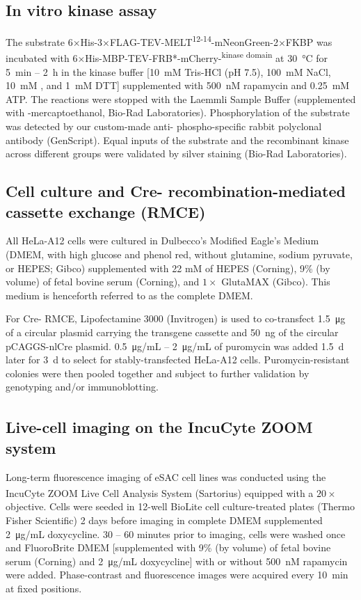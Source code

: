 \subsection{In vitro kinase assay}
The substrate 6×His-3×FLAG-TEV-MELT\textsuperscript{12-14}-mNeonGreen-2×FKBP was incubated with 6×His-MBP-TEV-FRB*-mCherry-\textsuperscript{kinase domain} at \SI{30}{\celsius} for \SI{5}{min} -- \SI{2}{h} in the kinase buffer [\SI{10}{mM} Tris-HCl (pH 7.5), \SI{100}{mM} NaCl, \SI{10}{mM} , and \SI{1}{mM} DTT] supplemented with \SI{500}{nM} rapamycin and \SI{0.25}{mM} ATP. The reactions were stopped with the Laemmli Sample Buffer (supplemented with \textbeta-mercaptoethanol, Bio-Rad Laboratories). Phosphorylation of the substrate was detected by our custom-made anti- phospho-specific rabbit polyclonal antibody (GenScript). Equal inputs of the substrate and the recombinant kinase across different groups were validated by silver staining (Bio-Rad Laboratories).

\subsection{Cell culture and Cre- recombination-mediated cassette exchange (RMCE)}
\label{CellCulture+RMCE_Methods}
All HeLa-A12 cells were cultured in Dulbecco's Modified Eagle's Medium (DMEM, with high glucose and phenol red, without glutamine, sodium pyruvate, or HEPES; Gibco) supplemented with 22 mM of HEPES (Corning), 9\% (by volume) of fetal bovine serum (Corning), and $1\times$ GlutaMAX (Gibco). This medium is henceforth referred to as the complete DMEM.

For Cre- RMCE, Lipofectamine 3000 (Invitrogen) is used to co-transfect \SI{1.5}{\micro g} of a circular plasmid carrying the transgene cassette and \SI{50}{ng} of the circular pCAGGS-nlCre plasmid. \SI{0.5}{\micro g/mL} -- \SI{2}{\micro g/mL} of puromycin was added \SI{1.5}{d} later for \SI{3}{d} to select for stably-transfected HeLa-A12 cells. Puromycin-resistant colonies were then pooled together and subject to further validation by genotyping and/or immunoblotting.

\subsection{Live-cell imaging on the IncuCyte\textsuperscript{\textregistered} ZOOM system}
Long-term fluorescence imaging of eSAC cell lines was conducted using the IncuCyte\textsuperscript{\textregistered} ZOOM Live Cell Analysis System (Sartorius) equipped with a $20\times$ objective. Cells were seeded in 12-well BioLite cell culture-treated plates (Thermo Fisher Scientific) 2 days before imaging in complete DMEM supplemented \SI{2}{\micro g/mL} doxycycline. 30 -- 60 minutes prior to imaging, cells were washed once and FluoroBrite\texttrademark{} DMEM [supplemented with 9\% (by volume) of fetal bovine serum (Corning) and \SI{2}{\micro g/mL} doxycycline] with or without \SI{500}{nM} rapamycin were added. Phase-contrast and fluorescence images were acquired every \SI{10}{min} at fixed positions.